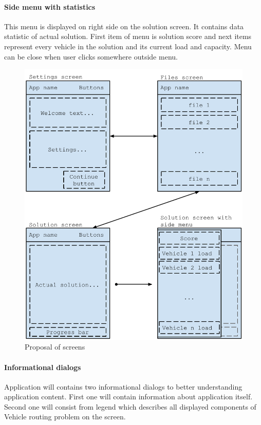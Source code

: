 \paragraph{Side menu with statistics}
This menu is displayed on right side on the solution screen. It contains data statistic of actual solution. First item
of menu is solution score and next items represent every vehicle in the solution and its current load and capacity.
Menu can be close when user clicks somewhere outside menu.

\begin{figure}[h!]
    \centering
    \includegraphics[scale=0.8]{fig/proposal.pdf}
    \caption{Proposal of screens}
    \label{proposalFig}
\end{figure}

\paragraph{Informational dialogs}
Application will contains two informational dialogs to better understanding application content. First one will contain
information about application itself. Second one will consist from legend which describes all displayed components of
Vehicle routing problem on the screen.

